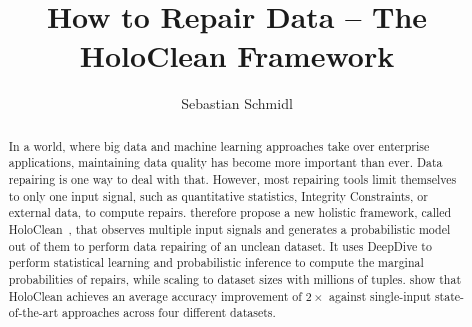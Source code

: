 \documentclass[format=sigconf]{acmart}
\newcommand{\holoclean}{HoloClean}
\newcommand{\deepdive}{DeepDive}
\begin{document}
\title[How to Repair Data -- The HoloClean Framework]{How to Repair Data -- The HoloClean Framework}

\author{Sebastian Schmidl}



\begin{abstract}
In a world, where big data and machine learning approaches take over enterprise applications, maintaining data quality has become more important than ever.
Data repairing is one way to deal with that.
However, most repairing tools limit themselves to only one input signal, such as quantitative statistics, Integrity Constraints, or external data, to compute repairs.
\citeauthor{holoclean} therefore propose a new holistic framework, called \holoclean~\cite{holoclean}, that observes multiple input signals and generates a probabilistic model out of them to perform data repairing of an unclean dataset.
It uses \deepdive{} to perform statistical learning and probabilistic inference to compute the marginal probabilities of repairs, while scaling to dataset sizes with millions of tuples.
\citeauthor{holoclean} show that \holoclean{} achieves an average accuracy improvement of $2 \times$ against single-input state-of-the-art approaches across four different datasets.
\end{abstract}






\maketitle
\thispagestyle{plain}

\renewcommand{\shortauthors}{S. Schmidl}






\end{document}
